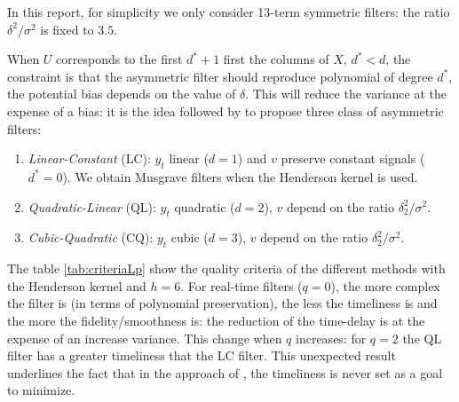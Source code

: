 \documentclass[
  12pt,
  ,
  a4paper]{article}
\newcommand\1{\mathds{1}}
\begin{document}
In this report, for simplicity we only consider 13-term symmetric filters: the ratio \(\delta^2/\sigma^2\) is fixed to \(3.5\).

When \(U\) corresponds to the first \(d^*+1\) first the columns of \(X\), \(d^*<d\), the constraint is that the asymmetric filter should reproduce polynomial of degree \(d^*\), the potential bias depends on the value of \(\delta\).
This will reduce the variance at the expense of a bias: it is the idea followed by \textcite{proietti2008} to propose three class of asymmetric filters:

\begin{enumerate}
\def\labelenumi{\arabic{enumi}.}
\item
  \emph{Linear-Constant} (LC): \(y_t\) linear (\(d=1\)) and \(v\) preserve constant signals (\(d^*=0\)).
  We obtain Musgrave filters when the Henderson kernel is used.
\item
  \emph{Quadratic-Linear} (QL): \(y_t\) quadratic (\(d=2\)), \(v\) depend on the ratio \(\delta_2^2/\sigma^2\).
\item
  \emph{Cubic-Quadratic} (CQ): \(y_t\) cubic (\(d=3\)), \(v\) depend on the ratio \(\delta_2^2/\sigma^2\).
\end{enumerate}

The table \ref{tab:criteriaLp} show the quality criteria of the different methods with the Henderson kernel and \(h=6\).
For real-time filters (\(q=0\)), the more complex the filter is (in terms of polynomial preservation), the less the timeliness is and the more the fidelity/smoothness is: the reduction of the time-delay is at the expense of an increase variance.
This change when \(q\) increases: for \(q=2\) the QL filter has a greater timeliness that the LC filter.
This unexpected result underlines the fact that in the approach of \textcite{proietti2008}, the timeliness is never set as a goal to minimize.
\end{document}
